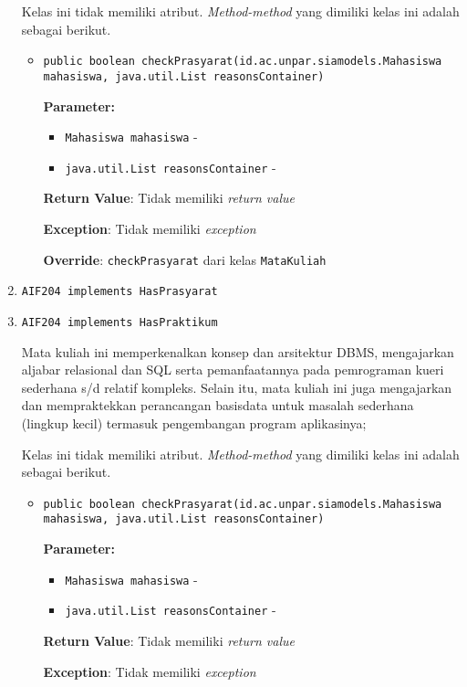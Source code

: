 \documentclass{article}
\begin{document}
\begin{enumerate}
Kelas ini tidak memiliki atribut. \textit{Method-method} yang dimiliki kelas ini adalah sebagai berikut.
\begin{itemize}
\item \texttt{public boolean checkPrasyarat(id.ac.unpar.siamodels.Mahasiswa mahasiswa, java.util.List reasonsContainer)}



\textbf{Parameter:}
\begin{itemize}
\item \texttt{Mahasiswa mahasiswa} - 
\item \texttt{java.util.List reasonsContainer} - 
\end{itemize}
\textbf{Return Value}: Tidak memiliki \textit{return value}

\textbf{Exception}: Tidak memiliki \textit{exception}

\textbf{Override}: \texttt{checkPrasyarat} dari kelas \texttt{MataKuliah}

\end{itemize}
\item \texttt{AIF204 implements HasPrasyarat}

\item \texttt{AIF204 implements HasPraktikum}

Mata kuliah ini memperkenalkan konsep dan arsitektur DBMS, mengajarkan 
 aljabar relasional dan SQL serta pemanfaatannya pada pemrograman kueri 
 sederhana s/d relatif kompleks. Selain itu, mata kuliah ini juga mengajarkan 
 dan mempraktekkan perancangan basisdata untuk masalah sederhana 
 (lingkup kecil) termasuk pengembangan program aplikasinya;

Kelas ini tidak memiliki atribut. \textit{Method-method} yang dimiliki kelas ini adalah sebagai berikut.
\begin{itemize}
\item \texttt{public boolean checkPrasyarat(id.ac.unpar.siamodels.Mahasiswa mahasiswa, java.util.List reasonsContainer)}



\textbf{Parameter:}
\begin{itemize}
\item \texttt{Mahasiswa mahasiswa} - 
\item \texttt{java.util.List reasonsContainer} - 
\end{itemize}
\textbf{Return Value}: Tidak memiliki \textit{return value}

\textbf{Exception}: Tidak memiliki \textit{exception}


\end{itemize}
\end{enumerate}
\end{document}
